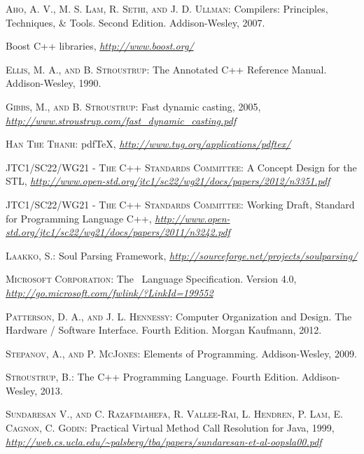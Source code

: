 \documentclass[a4paper,oneside,11pt]{article}
\begin{document}
\begin{thebibliography}{13}

 \textsc{Aho, A. V., M. S. Lam, R. Sethi, and J. D. Ullman}:
Compilers: Principles, Techniques, \& Tools. Second Edition. Addison-Wesley, 2007.

 Boost C++ libraries,
\textit{\url{http://www.boost.org/}}

 \textsc{Ellis, M. A., and B. Stroustrup}:
The Annotated C++ Reference Manual. Addison-Wesley, 1990.

 \textsc{Gibbs, M., and B. Stroustrup}:
Fast dynamic casting, 2005,
\textit{\url{http://www.stroustrup.com/fast_dynamic_casting.pdf}}

 \textsc{Han The Thanh}:
pdf\TeX, \textit{\url{http://www.tug.org/applications/pdftex/}}

 \textsc{JTC1/SC22/WG21 - The C++ Standards Committee}:
A Concept Design for the STL,
\textit{\url{http://www.open-std.org/jtc1/sc22/wg21/docs/papers/2012/n3351.pdf}}

 \textsc{JTC1/SC22/WG21 - The C++ Standards Committee}:
Working Draft, Standard for Programming Language C++,
\textit{\url{http://www.open-std.org/jtc1/sc22/wg21/docs/papers/2011/n3242.pdf}}

 \textsc{Laakko, S.}:
Soul Parsing Framework,
\textit{\url{http://sourceforge.net/projects/soulparsing/}}

 \textsc{Microsoft Corporation}:
The \csharp\ Language Specification. Version 4.0,
\textit{\url{http://go.microsoft.com/fwlink/?LinkId=199552}}

 \textsc{Patterson, D. A., and J. L. Hennessy}:
Computer Organization and Design. The Hardware / Software Interface. Fourth Edition.
Morgan Kaufmann, 2012.

 \textsc{Stepanov, A., and P. McJones}:
Elements of Programming. Addison-Wesley, 2009.

 \textsc{Stroustrup, B.}:
The C++ Programming Language. Fourth Edition. Addison-Wesley, 2013.

 \textsc{Sundaresan V., and C. Razafimahefa, R. Vallee-Rai, L. Hendren, P. Lam, E. Cagnon, C. Godin}:
Practical Virtual Method Call Resolution for Java, 1999,
\textit{\url{http://web.cs.ucla.edu/~palsberg/tba/papers/sundaresan-et-al-oopsla00.pdf}}

\end{thebibliography}
\end{document}
